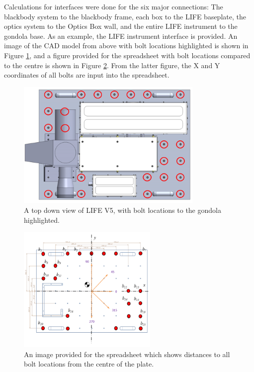 Calculations for interfaces were done for the six major connections: The blackbody system to the blackbody frame, each box to the LIFE baseplate, the optics system to the Optics Box wall, and the entire LIFE instrument to the gondola base. As an example, the LIFE instrument interface is provided. An image of the CAD model from above with bolt locations highlighted is shown in Figure \ref{fig:LIFE_V5_topdown_for_mech_justification}, and a figure provided for the spreadsheet with bolt locations compared to the centre is shown in Figure \ref{fig:mech_justification_bolt_hole_locations}. From the latter figure, the X and Y coordinates of all bolts are input into the spreadsheet.

\begin{figure}
    \centering
    \includegraphics[width=0.8\textwidth]{chap3_images/CAD_model_img_for_mech_justification.PNG}
    \caption{A top down view of LIFE V5, with bolt locations to the gondola highlighted.}
    \label{fig:LIFE_V5_topdown_for_mech_justification}
\end{figure}

\begin{figure}
    \centering
    \includegraphics[width=0.6\textwidth]{chap3_images/mech_justification_baseplate_figure.PNG}
    \caption{An image provided for the spreadsheet which shows distances to all bolt locations from the centre of the plate.}
    \label{fig:mech_justification_bolt_hole_locations}
\end{figure}

